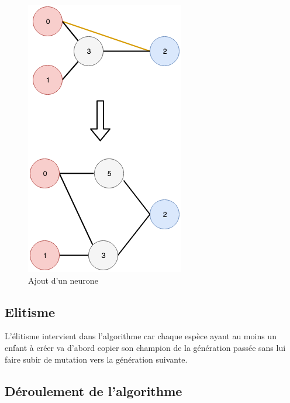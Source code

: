 \documentclass{article}
\begin{document}
\begin{figure}[H]
\begin{center}
	\includegraphics[scale=0.4]{addnode.png}
	\caption{Ajout d'un neurone}
\end{center}
\end{figure}

\subsection{Elitisme}

L'élitisme intervient dans l'algorithme car chaque espèce ayant au moins un enfant à créer va d'abord copier son champion de la génération passée sans lui faire subir de mutation vers la génération suivante.

\subsection{Déroulement de l'algorithme}
\end{document}
